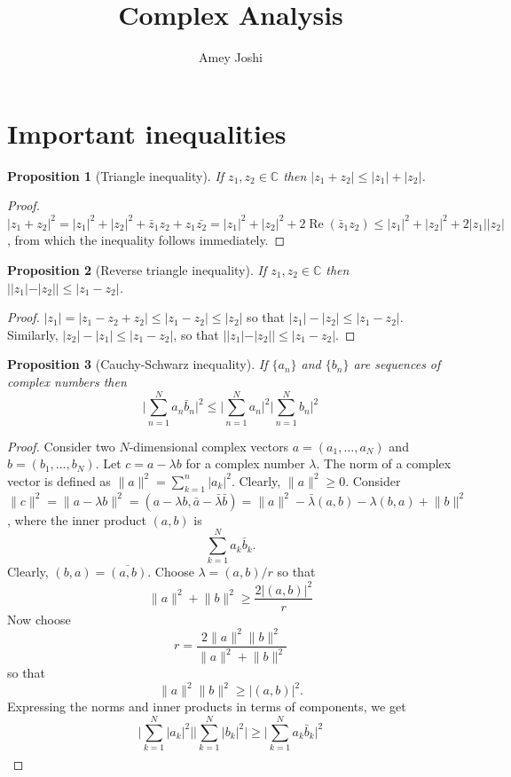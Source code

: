 \documentclass{article}
\theoremstyle{plain}
\numberwithin{thm}{section}
\theoremstyle{plain}
\newtheorem{prop}{Proposition}
\numberwithin{prop}{section}
\theoremstyle{plain}
\numberwithin{prop}{section}
\theoremstyle{definition}
\numberwithin{defn}{section}
\theoremstyle{remark}
\numberwithin{equation}{section}
\DeclareMathOperator{\re}{Re}
\begin{document}
\title{Complex Analysis}
\author{Amey Joshi}
\maketitle
\section{Important inequalities}\label{s1}
\begin{prop}[Triangle inequality]\label{s1p1}
If $z_1, z_2 \in \mathbb{C}$ then $|z_1 + z_2| \le |z_1| + |z_2|$.
\end{prop}
\begin{proof}
$|z_1 + z_2|^2 = |z_1|^2 + |z_2|^2 + \bar{z}_1z_2 + z_1\bar{z_2} = |z_1|^2 +
|z_2|^2 + 2\re(\bar{z}_1z_2) \le |z_1|^2 + |z_2|^2 + 2|z_1||z_2|$, from which
the inequality follows immediately.
\end{proof}

\begin{prop}[Reverse triangle inequality]\label{s1p2}
If $z_1, z_2 \in \mathbb{C}$ then $||z_1| - |z_2|| \le |z_1 - z_2|$.
\end{prop}
\begin{proof}
$|z_1| = |z_1 - z_2 + z_2| \le |z_1 - z_2| \le |z_2|$ so that $|z_1| - |z_2| 
\le |z_1 - z_2|$. Similarly, $|z_2| - |z_1| \le |z_1 - z_2|$, so that $||z_1| - 
|z_2|| \le |z_1 - z_2|$.
\end{proof}

\begin{prop}[Cauchy-Schwarz inequality]\label{s1p3}
If $\{a_n\}$ and $\{b_n\}$ are sequences of complex numbers then
\[
\Big|\sum_{n=1}^Na_n\bar{b}_n\Big|^2 \le \Big|\sum_{n=1}^Na_n\Big|^2 
\Big|\sum_{n=1}^Nb_n\Big|^2
\]
\end{prop}
\begin{proof}
Consider two $N$-dimensional complex vectors $a = (a_1, \ldots, a_N)$ and 
$b = (b_1, \ldots, b_N)$. Let $c = a - \lambda b$ for a complex number 
$\lambda$. The norm of a complex vector is defined as $\lVert a \rVert^2 = 
\sum_{k=1}^n |a_k|^2$. Clearly, $\lVert a \rVert^2 \ge 0$. Consider $\lVert c
\rVert^2 = \lVert a - \lambda b\rVert^2 = (a - \lambda b, \bar{a} - 
\bar{\lambda}\bar{b}) = \lVert a \rVert^2 - \bar{\lambda}(a, b) - \lambda(b, a)
+ \lVert b \rVert^2$, where the inner product $(a, b)$ is
\[
\sum_{k=1}^N a_k \bar{b}_k.
\]
Clearly, $(b, a) = \overline{(a, b)}$. Choose $\lambda = (a, b)/r$ so that
\[
\lVert a \rVert^2 + \lVert b \rVert^2 \ge \frac{2|(a, b)|^2}{r}
\]
Now choose 
\[
r = \frac{2\lVert a \rVert^2 \lVert b \rVert^2}{\lVert a \rVert^2 + \lVert b \rVert^2}
\]
so that
\[
\lVert a \rVert^2 \lVert b \rVert^2 \ge |(a, b)|^2.
\]
Expressing the norms and inner products in terms of components, we get
\[
\Big|\sum_{k=1}^N |a_k|^2\Big|\Big|\sum_{k=1}^N |b_k|^2\Big| \ge 
\Big|\sum_{k=1}^N a_k\bar{b}_k\Big|^2
\]
\begin{eqnarray*}
\end{eqnarray*}
\end{proof}
\end{document}
